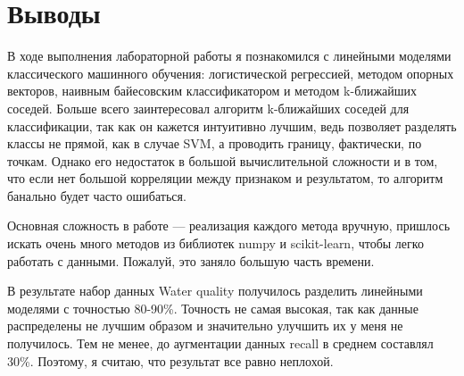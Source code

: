 \section{Выводы}
В ходе выполнения лабораторной работы я познакомился с линейными моделями классического машинного обучения: логистической регрессией, 
методом опорных векторов, наивным байесовским классификатором и методом k-ближайших соседей. Больше всего заинтересовал алгоритм 
k-ближайших соседей для классификации, так как он кажется интуитивно лучшим, ведь позволяет разделять классы не прямой, как в случае SVM,
а проводить границу, фактически, по точкам. Однако его недостаток в большой вычислительной сложности и в том, что если нет большой корреляции 
между признаком и результатом, то алгоритм банально будет часто ошибаться.

Основная сложность в работе --- реализация каждого метода вручную, пришлось искать очень много методов из библиотек numpy и scikit-learn, 
чтобы легко работать с данными. Пожалуй, это заняло большую часть времени.

В результате набор данных Water quality получилось разделить линейными моделями с точностью 80-90\%. Точность не самая высокая, так как данные распределены не лучшим образом и значительно улучшить их у меня не получилось. Тем не менее, до аугментации данных recall в среднем составлял 30\%. Поэтому, я считаю, что результат все равно неплохой.

\pagebreak
